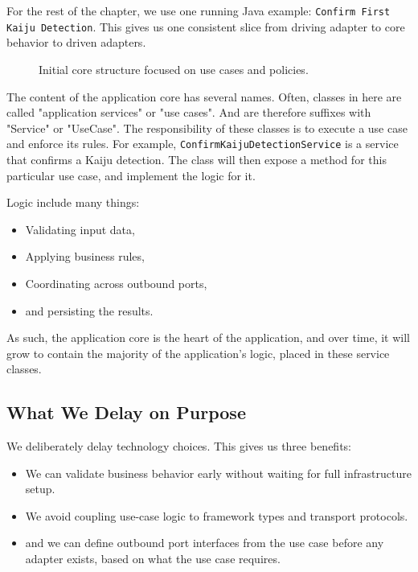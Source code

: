 For the rest of the chapter, we use one running Java example: \texttt{Confirm First Kaiju Detection}. This gives us one consistent slice from driving adapter to core behavior to driven adapters.

\begin{figure}[htbp]
    \centering
    
    \caption{Initial core structure focused on use cases and policies.}
    \label{fig:hexagonal_core_structure}
\end{figure}

The content of the application core has several names. Often, classes in here are called "application services" or "use cases". And are therefore suffixes with "Service" or "UseCase". The responsibility of these classes is to execute a use case and enforce its rules. For example, \texttt{ConfirmKaijuDetectionService} is a service that confirms a Kaiju detection. The class will then expose a method for this particular use case, and implement the logic for it.

Logic include many things:

\begin{itemize}
    \item Validating input data,
    \item Applying business rules,
    \item Coordinating across outbound ports,
    \item and persisting the results.
\end{itemize}

As such, the application core is the heart of the application, and over time, it will grow to contain the majority of the application's logic, placed in these service classes.

\subsection{What We Delay on Purpose}
\label{sec:hexagonal_delay_decisions}

We deliberately delay technology choices. This gives us three benefits:
\begin{itemize}
    \item We can validate business behavior early without waiting for full infrastructure setup.
    \item We avoid coupling use-case logic to framework types and transport protocols.
    \item and we can define outbound port interfaces from the use case before any adapter exists, based on what the use case requires.
\end{itemize}

